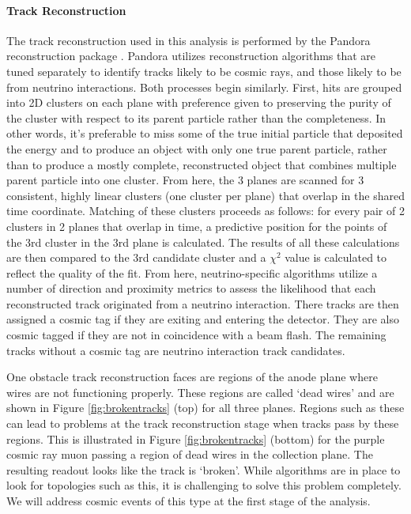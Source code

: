 \paragraph{Track Reconstruction}
The track reconstruction used in this analysis is performed by the Pandora reconstruction package \cite{bib:pandora}.  Pandora utilizes reconstruction algorithms that are tuned separately to identify tracks likely to be cosmic rays, and those likely to be from neutrino interactions. Both processes begin similarly.  First, hits are grouped into 2D clusters on each plane with preference given to preserving the purity of the cluster with respect to its parent particle rather than the completeness.  In other words, it's preferable to miss some of the true initial particle that deposited the energy and to produce an object with only one true parent particle, rather than to produce a mostly complete, reconstructed object that combines multiple parent particle into one cluster.  From here, the 3 planes are scanned for 3 consistent, highly linear clusters (one cluster per plane) that overlap in the shared time coordinate.  Matching of these clusters proceeds as follows:  for every pair of 2 clusters in 2 planes that overlap in time, a predictive position for the points of the 3rd cluster in the 3rd plane is calculated. The results of all these calculations are then compared to the 3rd candidate cluster and a $\chi^2$ value is calculated to reflect the quality of the fit. From here, neutrino-specific algorithms utilize a number of direction and proximity metrics to assess the likelihood that each reconstructed track originated from a neutrino interaction. There tracks are then assigned a cosmic tag if they are exiting and entering the detector.  They are also cosmic tagged if they are not in coincidence with a beam flash.  The remaining tracks without a cosmic tag are neutrino interaction track candidates.

\par One obstacle track reconstruction faces are regions of the anode plane where wires are not functioning properly.  These regions are called `dead wires' and are shown in Figure \ref{fig:brokentracks} (top) for all three planes.  Regions such as these can lead to problems at the track reconstruction stage when tracks pass by these regions.  This is illustrated in Figure \ref{fig:brokentracks} (bottom) for the purple cosmic ray muon passing a region of dead wires in the collection plane.  The resulting readout looks like the track is `broken'.  While algorithms are in place to look for topologies such as this, it is challenging to solve this problem completely.  We will address cosmic events of this type at the first stage of the analysis.

